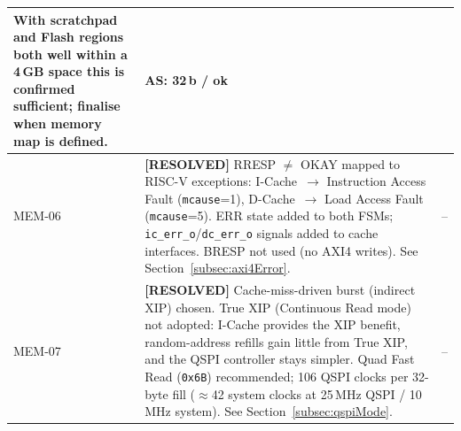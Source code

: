 \begin{table}[H]
\begin{tabularx}{\textwidth}{|l |X |l|}
           With scratchpad and Flash regions both well within a 4\,GB space
           this is confirmed sufficient; finalise when memory map is defined. & AS: 32\,b / ok \\
  \hline
  MEM-06 & \textbf{[RESOLVED]} RRESP $\neq$ OKAY mapped to RISC-V exceptions:
           I-Cache~$\rightarrow$ Instruction Access Fault (\texttt{mcause}=1),
           D-Cache~$\rightarrow$ Load Access Fault (\texttt{mcause}=5).
           ERR state added to both FSMs; \texttt{ic\_err\_o}/\texttt{dc\_err\_o}
           signals added to cache interfaces. BRESP not used (no AXI4 writes).
           See Section~\ref{subsec:axi4Error}. & -- \\
  \hline
  MEM-07 & \textbf{[RESOLVED]} Cache-miss-driven burst (indirect XIP) chosen.
           True XIP (Continuous Read mode) not adopted: I-Cache provides
           the XIP benefit, random-address refills gain little from True XIP,
           and the QSPI controller stays simpler.
           Quad Fast Read (\texttt{0x6B}) recommended; 106 QSPI clocks per
           32-byte fill ($\approx$42 system clocks at 25\,MHz QSPI / 10\,MHz system).
           See Section~\ref{subsec:qspiMode}. & -- \\
  \hline
\end{tabularx}
\end{table}
